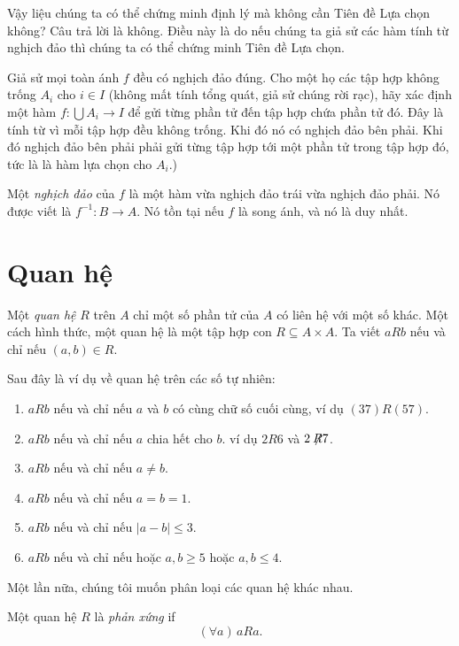 Vậy liệu chúng ta có thể chứng minh định lý mà không cần Tiên đề Lựa chọn không? Câu trả lời là không. Điều này là do nếu chúng ta giả sử các hàm tính từ nghịch đảo thì chúng ta có thể chứng minh Tiên đề Lựa chọn.

Giả sử mọi toàn ánh $f$ đều có nghịch đảo đúng. Cho một họ các tập hợp không trống $A_i$ cho $i\in I$ (không mất tính tổng quát, giả sử chúng rời rạc), hãy xác định một hàm $f: \bigcup A_i \to I$ để gửi từng phần tử đến tập hợp chứa phần tử đó. Đây là tính từ vì mỗi tập hợp đều không trống. Khi đó nó có nghịch đảo bên phải. Khi đó nghịch đảo bên phải phải gửi từng tập hợp tới một phần tử trong tập hợp đó, tức là là hàm lựa chọn cho $A_i$.)


\begin{defi}
  Một \emph{nghịch đảo} của $f$ là một hàm vừa nghịch đảo trái vừa nghịch đảo phải. Nó được viết là $f^{-1}: B\to A$. Nó tồn tại nếu $f$ là song ánh, và nó là duy nhất.
\end{defi}

\section{Quan hệ}

\begin{defi}[Quan hệ]
  Một \emph{quan hệ} $R$ trên $A$ chỉ một số phần tử của $A$ có liên hệ với một số khác. Một cách hình thức, một quan hệ là một tập hợp con $R\subseteq A\times A$. Ta viết $aRb$ nếu và chỉ nếu $(a, b)\in R$.
\end{defi}

\begin{eg}
  Sau đây là ví dụ về quan hệ trên các số tự nhiên:
  \begin{enumerate}
    \item $aRb$ nếu và chỉ nếu $a$ và $b$ có cùng chữ số cuối cùng, ví dụ $(37)R(57)$.
    \item $aRb$ nếu và chỉ nếu $a$ chia hết cho $b$. ví dụ $2R6$ và $2\not \!\!R 7$.
    \item $aRb$ nếu và chỉ nếu $a\not= b$.
    \item $aRb$ nếu và chỉ nếu $a = b = 1$.
    \item $aRb$ nếu và chỉ nếu $|a - b|\leq 3$.
    \item $aRb$ nếu và chỉ nếu hoặc $a, b\geq 5$ hoặc $a, b\leq 4$.
  \end{enumerate}
\end{eg}

Một lần nữa, chúng tôi muốn phân loại các quan hệ khác nhau.
\begin{defi}
  Một quan hệ $R$ là \emph{phản xứng} if
  \[
    (\forall a)\,aRa.
  \]
\end{defi}

